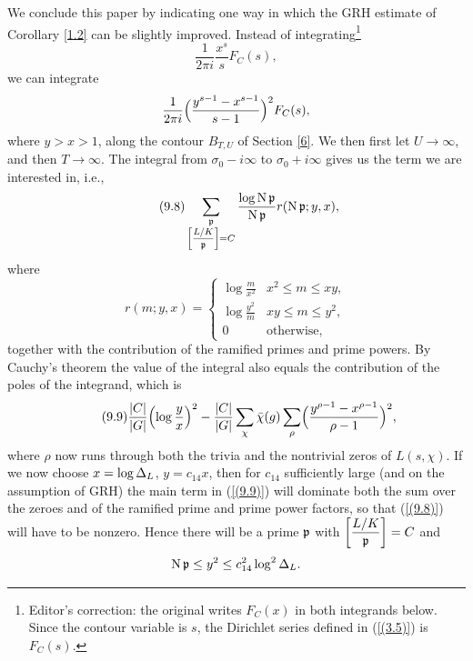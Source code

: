 \documentclass[./main]{subfiles}
\begin{document}
We conclude this paper by indicating one way in which the GRH estimate  of Corollary \ref{1.2} can be slightly improved.
Instead of integrating\footnote{Editor's correction: the original writes $F_C(x)$ in both integrands below. Since the contour variable is $s$, the Dirichlet series defined in (\ref{(3.5)}) is $F_C(s)$.}
\[
\frac{1}{2\pi i} \frac{x^s}{s} F_C(s),
\]
we can integrate
\[
\frac{1}{2\pi i} \Bigl(\frac{y^{s-1} - x^{s-1}}{s - 1}\Bigr)^{2} F_C(s),
\]
where $y > x > 1$,
along the contour $B_{T, U}$ of Section \ref{6}.
We then first let $U \to \infty$, and then $T \to \infty$.
The integral from $\sigma_0 - i\infty$ to $\sigma_0 + i \infty$ gives us the term we are interested in, i.e.,
\[\tag{9.8}\label{(9.8)}
\sum_{\substack{\p \\\Scale[0.75]{\ArtinSymbol{L/K}{\p}}=C}} \frac{\log \norm \p}{\norm \p} r(\norm \p; y, x),
\]
where
\[
r(m;y, x) = \begin{cases} \log \frac{m}{x^2} & x^2 \leq m \leq xy, \\ \log \frac{y^2}{m} & xy \leq m \leq y^2, \\ 0 & \text{otherwise}, \end{cases}
\]
together with the contribution of the ramified primes and prime powers.
By Cauchy's theorem the value of the integral also equals the contribution of the poles of the integrand, which is
\[\tag{9.9}\label{(9.9)}
\frac{|C|}{|G|} \Bigl(\log \frac{y}{x}\Bigr)^2 - \frac{|C|}{|G|} \sum_{\chi} \bar{\chi}(g) \sum_{\rho} \Bigl(\frac{y^{\rho - 1} - x^{\rho - 1}}{\rho - 1}\Bigr)^2,
\]
where $\rho$ now runs through both the trivia and the nontrivial zeros of $L(s, \chi)$.
If we now choose $x = \log \Delta_L $, $y = c_{14}x$, then for $c_{14}$ sufficiently large (and on the assumption of GRH) the main term in (\ref{(9.9)}) will dominate both the sum over the zeroes and of the ramified prime and prime power factors, so that (\ref{(9.8)}) will have to be nonzero.
Hence there will be a prime $\mathfrak{p}$ with $\bigg[\dfrac{L/K}{\mathfrak{p}}\bigg] = C$ and
\[
\operatorname{N} \mathfrak{p} \leq y^2 \leq c_{14}^2 \log^2 \Delta_L .
\]

\end{document}
